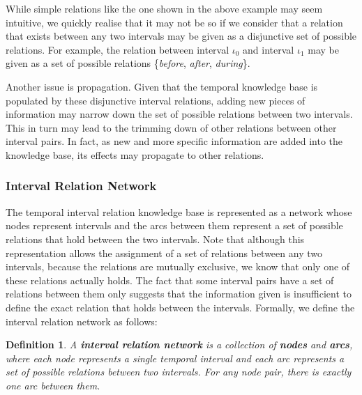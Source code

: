 \documentclass[11pt]{report}
\newtheorem{vdefinition}{Definition}[chapter]
\begin{document}
        While simple relations like the one shown in the above example may seem
        intuitive, we quickly realise that it may not be so if we consider that
        a relation that exists between any two intervals may be given as a
        disjunctive set of possible relations. For example, the relation
        between interval $\iota_0$ and interval $\iota_1$ may be given as a set
        of possible relations \{{\em before}, {\em after}, {\em during}\}.

        Another issue is propagation. Given that the temporal knowledge base
        is populated by these disjunctive interval relations, adding new
        pieces of information may narrow down the set of possible relations
        between two intervals. This in turn may lead to the trimming down of
        other relations between other interval pairs. In fact, as new and more
        specific information are added into the knowledge base, its effects may
        propagate to other relations.

        \subsubsection{Interval Relation Network}

          The temporal interval relation knowledge base is represented as a
          network whose nodes represent intervals and the arcs between them
          represent a set of possible relations that hold between the two
          intervals. Note that although this representation allows the
          assignment of a set of relations between any two intervals, because
          the relations are mutually exclusive, we know that only one of these
          relations actually holds. The fact that some interval pairs have a
          set of relations between them only suggests that the information
          given is insufficient to define the exact relation that holds
          between the intervals. Formally, we define the interval relation
          network as follows:

          \begin{vdefinition}
            \label{defn-tempo-netwk}
            A {\bf interval relation network} is a collection of {\bf nodes}
            and {\bf arcs}, where each node represents a single temporal
            interval and each arc represents a set of possible relations
            between two intervals. For any node pair, there is exactly one arc
            between them.
          \end{vdefinition}
\end{document}
